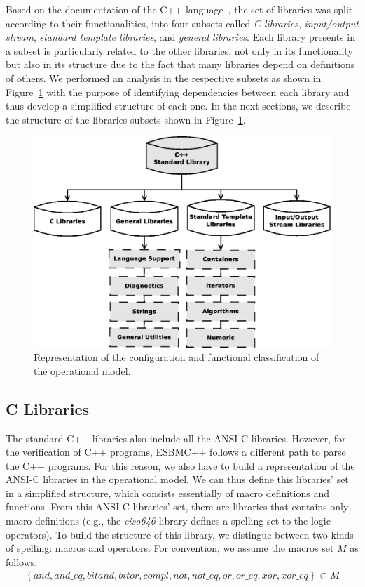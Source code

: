 \documentclass[a4paper]{llncs}
\begin{document}
Based on the documentation of the C++ language~\cite{CppReference12}, the set of libraries 
was split, according to their functionalities, into four subsets called \textit{C libraries}, 
\textit{input/output stream}, \textit{standard template libraries}, and \textit{general libraries}. 
Each library presents in a subset is particularly related to the other libraries, not only in its 
functionality but also in its structure due to the fact that many libraries depend on 
definitions of others. We performed an analysis in the respective subsets 
as shown in Figure~\ref{figure:cpp-diagram} with the purpose of identifying dependencies 
between each library and thus develop a simplified structure of each one. In the next sections, 
we describe the structure of the libraries subsets shown in Figure~\ref{figure:cpp-diagram}.
%
\begin{figure}[ht]
\centering
\includegraphics[scale=0.28]{figures/diagramascpp}
\caption{Representation of the configuration and functional classification of the operational model.}
\label{figure:cpp-diagram}
\end{figure}

\subsection{C Libraries}

The standard C++ libraries also include all the ANSI-C libraries. 
However, for the verification of C++ programs, ESBMC++ 
follows a different path to parse the C++ programs. 
For this reason, we also have to build a representation 
of the ANSI-C libraries in the operational model. We can thus 
define this libraries' set in a simplified structure, which consists 
essentially of macro definitions and functions. From this ANSI-C libraries' set, 
there are libraries that contains only macro definitions (e.g., the \textit{ciso646} library 
defines a spelling set to the logic operators). To build the structure of this 
library, we distingue between two kinds of spelling: macros and operators. 
For convention, we assume the macros set $M$ as follows: 
%
\begin{eqnarray}
\label{ciso646-macro-set}
\left\{and, and\_eq, bitand, bitor, compl, not, not\_eq, or, or\_eq, xor, xor\_eq\right\} \subset M
\end{eqnarray}
\end{document}
